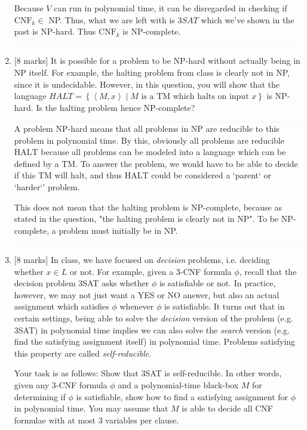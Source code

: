 \documentclass{article}
\newcommand{\class}[1]{\text{#1}}
\newcommand{\set}[1]{{\left\{#1\right\}}}    %
\newcommand{\enc}[1]{\left<#1\right>}
\begin{document}
\begin{enumerate}
            Because $V$ can run in polynomial time, it can be disregarded in checking if $\class{CNF}_k \in$ NP. Thus, what we are left with is $3SAT$ which we've shown in the past is NP-hard. Thus $\class{CNF}_k$ is NP-complete.

            $\textcolor[RGB]{220,220,220}{\rule{\linewidth}{0.2pt}}$

    \item {[8 marks]} It is possible for a problem to be NP-hard without actually being in NP itself. For example, the halting problem from class is clearly not in NP, since it is undecidable. However, in this question, you will show that the language $HALT=\set{\enc{M,x}\mid M\text{ is a TM which halts on input }x}$ is NP-hard. Is the halting problem hence NP-complete?


            $\textcolor[RGB]{220,220,220}{\rule{\linewidth}{0.2pt}}$
            A problem NP-hard means that all problems in NP are reducible to this problem in polynomial time. By this, obviously all problems are reducible $\class{HALT}$ because all problems can be modeled into a language which can be defined by a TM. To answer the problem, we would have to be able to decide if this TM will halt, and thus $\class{HALT}$ could be considered a `parent` or `harder`' problem.

            This does not mean that the halting problem is NP-complete, because as stated in the question, "the halting problem is clearly not in NP". To be NP-complete, a problem must initially be in NP.

            $\textcolor[RGB]{220,220,220}{\rule{\linewidth}{0.2pt}}$

    \item {[8 marks]} In class, we have focused on \emph{decision} problems, i.e. deciding whether $x\in L$ or not. For example, given a 3-CNF formula $\phi$, recall that the decision problem 3SAT asks whether $\phi$ is satisfiable or not. In practice, however, we may not just want a YES or NO answer, but also an actual assignment which satisfies $\phi$ whenever $\phi$ is satisfiable. It turns out that in certain settings, being able to solve the \emph{decision} version of the problem (e.g. 3SAT) in polynomial time implies we can also solve the \emph{search} version (e.g. find the satisfying assignment itself) in polynomial time. Problems satisfying this property are called \emph{self-reducible}.

Your task is as follows: Show that 3SAT is self-reducible. In other words, given any 3-CNF formula $\phi$ and a polynomial-time black-box $M$ for determining if $\phi$ is satisfiable, show how to find a satisfying assignment for $\phi$ in polynomial time. You may assume that $M$ is able to decide all CNF formulae with {at most} 3 variables per clause.


\end{enumerate}
\end{document}

